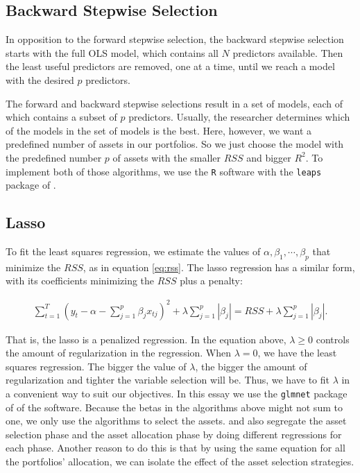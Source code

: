 \documentclass[12pt,oneside,a4paper]{memoir}
\begin{document}

\subsection{Backward Stepwise Selection}

In opposition to the forward stepwise selection, the backward stepwise selection starts with the full OLS model, which contains all $N$ predictors available.
Then the least useful predictors are removed, one at a time, until we reach a model with the desired $p$ predictors.


The forward and backward stepwise selections result in a set of models, each of which contains a subset of $p$ predictors.
Usually, the researcher determines which of the models in the set of models is the best.
Here, however, we want a predefined number of assets in our portfolios.
So we just choose the model with the predefined number $p$ of assets with the smaller $RSS$ and bigger $R^2$.
To implement both of those algorithms, we  use the \texttt{R} software \cite{R} with the \texttt{leaps} package of .

\subsection{Lasso}

To fit the least squares regression, we estimate the values of $\alpha, \beta_1, \cdots, \beta_p$ that minimize the $RSS$, as in equation \eqref{eq:rss}.
The lasso regression has a similar form, with its coefficients minimizing the $RSS$ plus a penalty: 

\vspace{-18 pt}
\begin{align} \label{lasso-reg} %
\sum_{t=1}^{T} 
\left( y_t - \alpha - \sum_{j=1}^{p} \beta_j x_{tj} \right)^2 +
\lambda \sum_{j=1}^{p} |\beta_{j}| =
	RSS + 
	\lambda \sum_{j=1}^{p} |\beta_{j}| .
\end{align}

\noindent
That is, the lasso is a penalized regression.
In the equation above, $\lambda \geq 0$ controls the amount of regularization in the regression.
When $\lambda = 0$, we have the least squares regression.
The bigger the value of $\lambda$, the bigger the amount of regularization and tighter the variable selection will be.
Thus, we have to fit $\lambda$ in a convenient way to suit our objectives.
In this essay we use the \texttt{glmnet} package of  of the  software.
Because the betas in the algorithms above might not sum to one, we only use the algorithms to select the assets.
 and  also segregate the asset selection phase and the asset allocation phase by doing different regressions for each phase.
Another reason to do this is that by using the same equation for all the portfolios' allocation, we can isolate the effect of the asset selection strategies.
\end{document}
